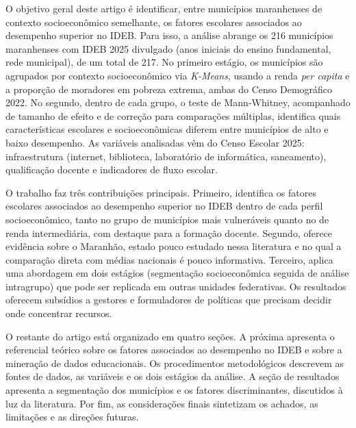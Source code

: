 O objetivo geral deste artigo é identificar, entre municípios maranhenses de contexto socioeconômico semelhante, os fatores escolares associados ao desempenho superior no IDEB. Para isso, a análise abrange os 216 municípios maranhenses com IDEB 2025 divulgado (anos iniciais do ensino fundamental, rede municipal), de um total de 217. No primeiro estágio, os municípios são agrupados por contexto socioeconômico via \textit{K-Means}, usando a renda \textit{per capita} e a proporção de moradores em pobreza extrema, ambas do Censo Demográfico 2022. No segundo, dentro de cada grupo, o teste de Mann-Whitney, acompanhado de tamanho de efeito e de correção para comparações múltiplas, identifica quais características escolares e socioeconômicas diferem entre municípios de alto e baixo desempenho. As variáveis analisadas vêm do Censo Escolar 2025: infraestrutura (internet, biblioteca, laboratório de informática, saneamento), qualificação docente e indicadores de fluxo escolar.

O trabalho faz três contribuições principais. Primeiro, identifica os fatores escolares associados ao desempenho superior no IDEB dentro de cada perfil socioeconômico, tanto no grupo de municípios mais vulneráveis quanto no de renda intermediária, com destaque para a formação docente. Segundo, oferece evidência sobre o Maranhão, estado pouco estudado nessa literatura e no qual a comparação direta com médias nacionais é pouco informativa. Terceiro, aplica uma abordagem em dois estágios (segmentação socioeconômica seguida de análise intragrupo) que pode ser replicada em outras unidades federativas. Os resultados oferecem subsídios a gestores e formuladores de políticas que precisam decidir onde concentrar recursos.

O restante do artigo está organizado em quatro seções. A próxima apresenta o referencial teórico sobre os fatores associados ao desempenho no IDEB e sobre a mineração de dados educacionais. Os procedimentos metodológicos descrevem as fontes de dados, as variáveis e os dois estágios da análise. A seção de resultados apresenta a segmentação dos municípios e os fatores discriminantes, discutidos à luz da literatura. Por fim, as considerações finais sintetizam os achados, as limitações e as direções futuras.
